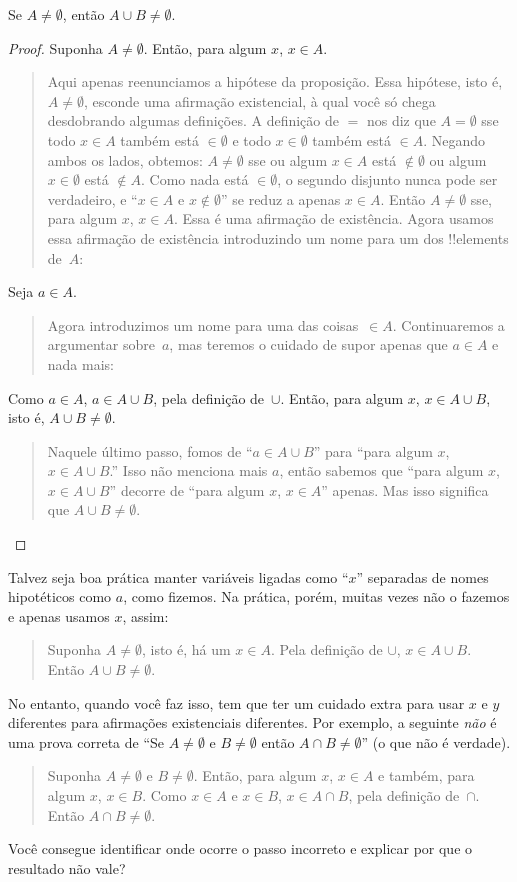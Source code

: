 \documentclass[../../../include/open-logic-section]{subfiles}
\begin{document}
\begin{prop}
Se $A \neq \emptyset$, então $A \cup B \neq \emptyset$.
\end{prop}

\begin{proof}
  Suponha $A \neq \emptyset$. Então, para algum $x$, $x \in A$. 
  \begin{quote}
    Aqui apenas reenunciamos a hipótese da
    proposição. Essa hipótese, isto é, $A \neq \emptyset$, esconde uma
    afirmação existencial, à qual você só chega desdobrando algumas
    definições. A definição de $=$ nos diz que $A = \emptyset$
    sse todo $x \in A$ também está $\in \emptyset$ e todo $x \in
    \emptyset$ também está $\in A$. Negando ambos os lados, obtemos: $A \neq
    \emptyset$ sse ou algum $x \in A$ está $\notin \emptyset$ ou algum
    $x \in \emptyset$ está $\notin A$. Como nada está $\in \emptyset$,
    o segundo disjunto nunca pode ser verdadeiro, e ``$x \in A$ e $x
    \notin \emptyset$'' se reduz a apenas $x \in A$. Então $A \neq
    \emptyset$ sse, para algum $x$, $x \in A$. Essa é uma afirmação de
    existência. Agora usamos essa afirmação de existência introduzindo um nome para
    um dos !!{element}s de~$A$:
  \end{quote}
  Seja $a \in A$.
  \begin{quote}
    Agora introduzimos um nome para uma das coisas~$\in A$. Continuaremos
    a argumentar sobre~$a$, mas teremos o cuidado de supor apenas
    que $a \in A$ e nada mais:
  \end{quote}
  Como $a \in A$, $a \in A \cup B$, pela definição de~$\cup$. Então, para
  algum $x$, $x \in A \cup B$, isto é, $A \cup B \neq \emptyset$.
  \begin{quote}
    Naquele último passo, fomos de ``$a \in A \cup B$'' para ``para algum
    $x$, $x \in A \cup B$.'' Isso não menciona mais $a$, então
    sabemos que ``para algum $x$, $x \in A \cup B$'' decorre de ``para
    algum $x$, $x \in A$'' apenas. Mas isso significa que $A \cup B \neq
    \emptyset$.
  \end{quote}
\end{proof}

Talvez seja boa prática manter variáveis ligadas como ``$x$'' separadas
de nomes hipotéticos como $a$, como fizemos. Na prática, porém,
muitas vezes não o fazemos e apenas usamos $x$, assim:
\begin{quote}
Suponha $A \neq \emptyset$, isto é, há um $x \in A$. Pela definição
de $\cup$, $x \in A \cup B$. Então $A \cup B \neq \emptyset$.
\end{quote}
No entanto, quando você faz isso, tem que ter um cuidado extra para usar
$x$ e $y$ diferentes para afirmações existenciais diferentes. Por
exemplo, a seguinte \emph{não} é uma prova correta de ``Se $A \neq
\emptyset$ e $B \neq \emptyset$ então $A \cap B \neq \emptyset$''
(o que não é verdade).
\begin{quote}
Suponha $A \neq \emptyset$ e $B \neq \emptyset$. Então, para algum $x$, $x
\in A$ e também, para algum $x$, $x \in B$. Como $x \in A$ e $x \in
B$, $x \in A \cap B$, pela definição de~$\cap$. Então $A \cap B \neq
\emptyset$.
\end{quote}
Você consegue identificar onde ocorre o passo incorreto e explicar por que o
resultado não vale?
\end{document}
